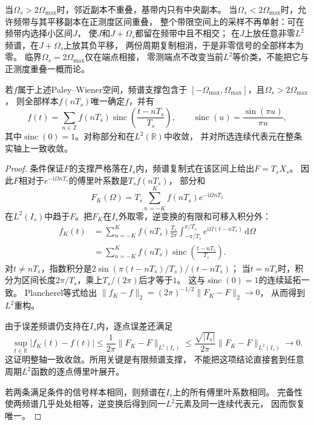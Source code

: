 当$\Omega_s>2\Omega_{\max}$时，邻近副本不重叠，基带内只有中央副本。
当$\Omega_s<2\Omega_{\max}$时，允许频带与其平移副本在正测度区间重叠，
整个带限空间上的采样不再单射：可在频带内选择小区间$J$，
使$J$和$J+\Omega_s$都留在频带中且不相交；
在$J$上放任意非零$L^2$频谱，在$J+\Omega_s$上放其负平移，
两份周期复制相消，于是非零信号的全部样本为零。
临界$\Omega_s=2\Omega_{\max}$仅在端点相接，
零测端点不改变当前$L^2$等价类，不能把它与正测度重叠一概而论。

\begin{theorem}[带限信号的采样重构]
  \label{thm:signal-analysis-sampling}
  若$f$属于上述Paley--Wiener空间，频谱支撑包含于
  $[-\Omega_{\max},\Omega_{\max}]$，且$\Omega_s>2\Omega_{\max}$，
  则全部样本$f(nT_s)$唯一确定$f$，并有
  \begin{equation}
    f(t)=\sum_{n\in\mathbb Z}f(nT_s)
    \operatorname{sinc}\left(\frac{t-nT_s}{T_s}\right),
    \qquad \operatorname{sinc}(u)=\frac{\sin(\pi u)}{\pi u},
    \label{eq:signal-analysis-sinc-reconstruction}
  \end{equation}
  其中$\operatorname{sinc}(0)=1$。对称部分和在$L^2(\mathbb R)$中收敛，
  并对所选连续代表元在整条实轴上一致收敛。
\end{theorem}
\begin{proof}
  条件保证$F$的支撑严格落在$I_s$内，频谱复制式在该区间上给出$F=T_sX_s$。
  因此$F$相对于$e^{-\mathrm i\Omega nT_s}$的傅里叶系数是$T_sf(nT_s)$，
  部分和
  \[
    F_K(\Omega)=T_s\sum_{n=-K}^{K}f(nT_s)e^{-\mathrm i\Omega nT_s}
  \]
  在$L^2(I_s)$中趋于$F$。把$F_K$在$I_s$外取零，逆变换的有限和可移入积分外：
  \begin{align*}
    f_K(t)
    &=\sum_{n=-K}^{K}f(nT_s)\frac{T_s}{2\pi}
      \int_{-\pi/T_s}^{\pi/T_s}e^{\mathrm i\Omega(t-nT_s)}\,\mathrm d\Omega\\
    &=\sum_{n=-K}^{K}f(nT_s)
      \operatorname{sinc}\left(\frac{t-nT_s}{T_s}\right).
  \end{align*}
  对$t\neq nT_s$，指数积分是$2\sin(\pi(t-nT_s)/T_s)/(t-nT_s)$；
  当$t=nT_s$时，积分为区间长度$2\pi/T_s$，乘上$T_s/(2\pi)$后才等于$1$。
  这与$\operatorname{sinc}(0)=1$的连续延拓一致。
  Plancherel等式给出
  $\|f_K-f\|_2=(2\pi)^{-1/2}\|F_K-F\|_2\to0$，
  从而得到$L^2$重构。

  由于误差频谱仍支持在$I_s$内，逐点误差还满足
  \[
    \sup_{t\in\mathbb R}|f_K(t)-f(t)|
    \leq\frac1{2\pi}\|F_K-F\|_{L^1(I_s)}
    \leq\frac{\sqrt{|I_s|}}{2\pi}\|F_K-F\|_{L^2(I_s)}
    \longrightarrow0.
  \]
  这证明整轴一致收敛。所用关键是有限频谱支撑，
  不能把这项结论直接套到任意周期$L^2$函数的逐点傅里叶展开。

  若两条满足条件的信号样本相同，则频谱在$I_s$上的所有傅里叶系数相同。
  完备性使两频谱几乎处处相等，逆变换后得到同一$L^2$元素及同一连续代表元，
  因而恢复唯一。
\end{proof}

